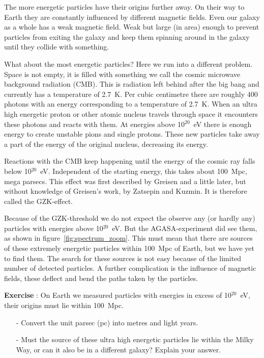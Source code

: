 The more energetic particles have their origins further away. On their way to Earth they are constantly influenced by different magnetic fields. Even our galaxy as a whole has a weak magnetic field. Weak but large (in area) enough to prevent particles from exiting the galaxy and keep them spinning around in the galaxy until they collide with something.

What about the most energetic particles? Here we run into a different problem. Space is not empty, it is filled with something we call the cosmic microwave background radiation (CMB). This is radiation left behind after the big bang and currently has a temperature of 2.7~K. Per cubic centimetre there are roughly 400 photons with an energy corresponding to a temperature of 2.7~K. When an ultra high energetic proton or other atomic nucleus travels through space it encounters these photons and reacts with them. At energies above 10$^{20}$~eV  there is enough energy to create unstable pions and single protons. These new particles take away a part of the energy of the original nucleus, decreasing its energy.

Reactions with the CMB keep happening until the energy of the cosmic ray falls below 10$^{20}$~eV. Independent of the starting energy, this takes about 100~Mpc, mega parsecs. This effect was first described by Greisen and a little later, but without knowledge of Greisen's work, by Zatsepin and Kuzmin. It is therefore called the GZK-effect.

Because of the GZK-threshold we do not expect the observe any (or hardly any) particles with energies above 10$^{20}$~eV. But the AGASA-experiment did see them, as shown in figure~\ref{fig:spectrum_zoom}. This must mean that there are sources of these extremely energetic particles within 100~Mpc of Earth, but we have yet to find them. The search for these sources is not easy because of the limited number of detected particles. A further complication is the influence of magnetic fields, these deflect and bend the paths taken by the particles. 

\begin{shaded}
\textbf{Exercise \theExercise {}} : On Earth we measured particles with energies in excess of 10$^{20}$~eV, their origins must lie within 100~Mpc.
\begin{itemize}
\item[-] Convert the unit parsec (pc) into metres and light years.
\item[-] Must the source of these ultra high energetic particles lie within the Milky Way, or can it also be in a different galaxy? Explain your answer.
\end{itemize}\end{shaded}


